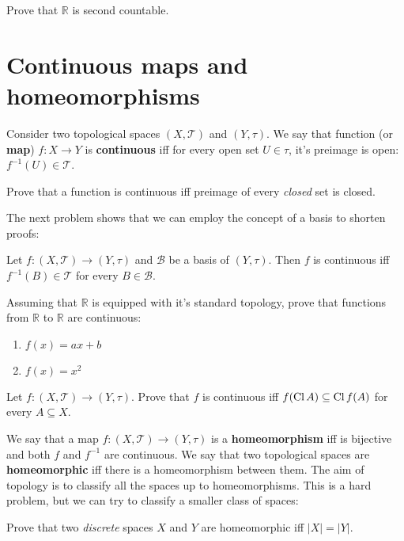 \begin{prob}
  Prove that $\mathbb R$ is second countable.
\end{prob}

\section{Continuous maps and homeomorphisms}
Consider two topological spaces $(X,\mathcal T)$ and $(Y, \tau)$.
We say that function (or \textbf{map}) $f:X\to Y$ is \textbf{continuous} iff for every
open set $U\in \tau$, it's preimage is open: $f^{-1}(U)\in \mathcal T$.

\begin{prob}
  Prove that a function is continuous iff preimage of every \textit{closed} set is closed.
\end{prob}

The next problem shows that we can employ the concept of a basis to
shorten proofs:

\begin{prob}
  Let $f: (X,\mathcal T)\to (Y, \tau)$ and $\mathcal B$ be a basis of
  $(Y, \tau)$. Then $f$ is continuous iff $f^{-1}(B)\in \mathcal T$ for every $B\in \mathcal B$.
\end{prob}

\begin{prob}
  Assuming that $\mathbb R$ is equipped with it's standard topology,
  prove that functions from $\mathbb R$ to $\mathbb R$ are continuous:
  \begin{enumerate}
    \item $f(x)=ax+b$
    \item $f(x)=x^2$
  \end{enumerate}
\end{prob}

\begin{prob}
  Let $f: (X,\mathcal T)\to (Y, \tau)$. Prove that $f$ is continuous
  iff $f(\text{Cl\,} A)\subseteq \text{Cl\,} f(A)$ for every $A\subseteq X$.
\end{prob}

We say that a map $f: (X,\mathcal T)\to (Y, \tau)$ is a \textbf{homeomorphism} iff is bijective and both $f$ and $f^{-1}$ are continuous. We say that two topological spaces are \textbf{homeomorphic} iff there is a homeomorphism between them. The aim of topology is to classify all the spaces up to homeomorphisms. This is a hard problem, but we can try to classify a smaller class of spaces:

\begin{prob}
  Prove that two \textit{discrete} spaces $X$ and $Y$ are homeomorphic iff $|X|=|Y|.$
\end{prob}

